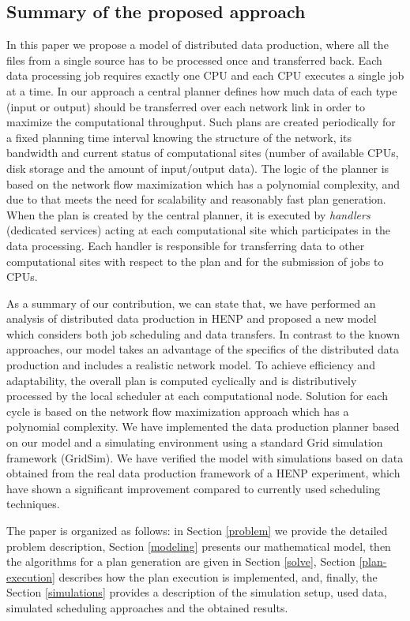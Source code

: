 \documentclass{svjour3}                     %
\begin{document}
\subsection{Summary of the proposed approach}
In this paper we propose a model of distributed data production, where all the files from a single source has to be processed once and transferred back. Each data processing job requires exactly one CPU and each CPU executes a single job at a time. In our approach a central planner defines how much data of each type (input or output) should be transferred over each network link in order to maximize the computational throughput. Such plans are created periodically for a fixed planning time interval knowing the structure of the network, its bandwidth and current status of computational sites (number of available CPUs, disk storage and the amount of input/output data). The logic of the planner is based on the network flow maximization which has a polynomial complexity, and due to that meets the need for scalability and reasonably fast plan generation. When the plan is created by the central planner, it is executed by \textit{handlers} (dedicated services) acting at each computational site which participates in the data processing. Each handler is responsible for transferring data to other computational sites with respect to the plan and for the submission of jobs to CPUs. 
 
As a summary of our contribution, we can state that, we have performed an analysis of distributed data production in HENP and proposed a new model which considers both job scheduling and data transfers. In contrast to the known approaches, our model takes an advantage of the specifics of the distributed data production and includes a realistic network model. To achieve efficiency and adaptability, the overall plan is computed cyclically and is distributively processed by the local scheduler at each computational node. Solution for each cycle is based on the network flow maximization approach which has a polynomial complexity. We have implemented the data production planner based on our model and a simulating environment using a standard Grid simulation framework (GridSim). We have verified the model with simulations based on data obtained from the real data production framework of a HENP experiment, which have shown a significant improvement compared to currently used scheduling techniques. 

\hfill 

The paper is organized as follows: in Section \ref{problem} we provide the detailed problem description, Section \ref{modeling} presents our mathematical model, then the algorithms for a plan generation are given in Section \ref{solve}, Section \ref{plan-execution} describes how the plan execution is implemented, and, finally, the Section \ref{simulations} provides a description of the simulation setup, used data, simulated scheduling approaches and the obtained results. 
\end{document}
